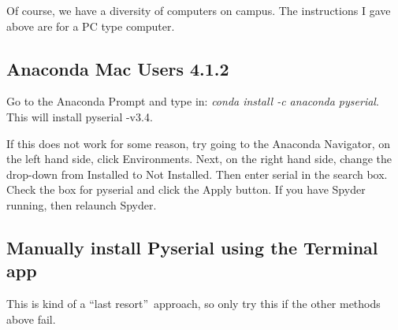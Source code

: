 Of course, we have a diversity of computers on campus. The instructions I
gave above are for a PC type computer.

\subsection{Anaconda Mac Users 4.1.2}

Go to the Anaconda Prompt and type in: \textit{conda install -c anaconda
pyserial}. This will install pyserial -v3.4.


If this does not work for some reason, try going to the Anaconda Navigator,
on the left hand side, click Environments. Next, on the right hand side,
change the drop-down from Installed to Not Installed. Then enter serial in
the search box. Check the box for pyserial and click the Apply button. If
you have Spyder running, then relaunch Spyder.




\subsection{Manually install Pyserial using the Terminal app}

This is kind of a \textquotedblleft last resort\textquotedblright\ approach,
so only try this if the other methods above fail.

